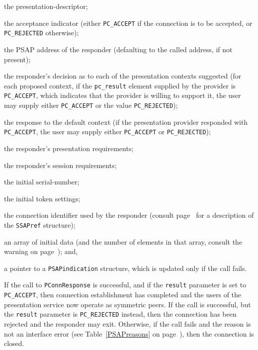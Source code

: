 \begin{describe}
\item[\verb"sd":] the presentation-descriptor;

\item[\verb"result":] the acceptance indicator
(either \verb"PC_ACCEPT" if the connection is to be accepted,
or \verb"PC_REJECTED" otherwise);

\item[\verb"responding":] the PSAP address of the responder (defaulting to the
called address, if not present);

\item[\verb"ctxlist":] the responder's decision as to each of the presentation
contexts suggested
(for each proposed context,
if the \verb"pc_result" element supplied by the provider is \verb"PC_ACCEPT",
which indicates that the provider is willing to support it,
the user may supply either \verb"PC_ACCEPT" or the value \verb"PC_REJECTED");

\item[\verb"defctxresult":] the response to the default context
(if the presentation provider responded with \verb"PC_ACCEPT",
the user may supply either \verb"PC_ACCEPT" or
\verb"PC_REJECTED");

\item[\verb"prequirements":] the responder's presentation requirements;

\item[\verb"srequirements":] the responder's session requirements;

\item[\verb"isn":] the initial serial-number;

\item[\verb"settings":] the initial token settings;

\item[\verb"ref":]  the connection identifier used by the responder
(consult page~\pageref{SSAPref} for a description of the \verb"SSAPref"
structure);

\item[\verb"data"/\verb"ndata":] an array of initial data
(and the number of elements in that array,
consult the warning on page~\pageref{PSAPdata});
and,

\item[\verb"pi":] a pointer to a \verb"PSAPindication" structure, which is
updated only if the call fails.
\end{describe}
If the call to \verb"PConnResponse" is successful,
and if the \verb"result" parameter is set to \verb"PC_ACCEPT",
then connection establishment has completed
and the users of the presentation service now operate as symmetric peers.
If the call is successful,
but the \verb"result" parameter is \verb"PC_REJECTED" instead,
then the connection has been rejected and the responder may exit.
Otherwise, if the call fails and the reason is not an interface error
(see Table~\ref{PSAPreasons} on page~\pageref{PSAPreasons}),
then the connection is closed.

